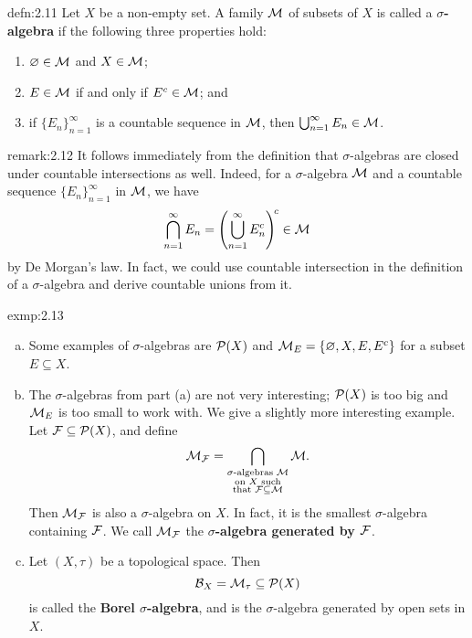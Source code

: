 \begin{defn}{defn:2.11}
    Let $X$ be a non-empty set. A family ${\cal M}$ of subsets of $X$ is 
    called a {\bf $\sigma$-algebra} if the following three properties hold: 
    \begin{enumerate}[(1)]
        \item $\varnothing \in {\cal M}$ and $X \in {\cal M}$; 
        \item $E \in {\cal M}$ if and only if $E^c \in {\cal M}$; and 
        \item if $\{E_n\}_{n=1}^\infty$ is a countable sequence in ${\cal M}$, 
        then $\bigcup_{n=1}^\infty E_n \in {\cal M}$. 
    \end{enumerate}
\end{defn}

\begin{remark}{remark:2.12}
    It follows immediately from the definition that $\sigma$-algebras 
    are closed under countable intersections as well. Indeed, for 
    a $\sigma$-algebra ${\cal M}$ and a countable sequence $\{E_n\}_{n=1}^\infty$ 
    in ${\cal M}$, we have 
    \[ \bigcap_{n=1}^\infty E_n = \left( \bigcup_{n=1}^\infty E_n^c \right)^{\!c} 
    \in {\cal M} \] 
    by De Morgan's law. In fact, we could use countable intersection 
    in the definition of a $\sigma$-algebra and derive countable unions from it.
\end{remark}

\begin{exmp}{exmp:2.13}
    \begin{enumerate}[(a)]

        \item Some examples of $\sigma$-algebras are ${\cal P}(X)$ and 
        ${\cal M}_E = \{\varnothing, X, E, E^c\}$ for a subset $E \subseteq X$.

        \item The $\sigma$-algebras from part (a) are not very interesting; 
        ${\cal P}(X)$ is too big and ${\cal M}_E$ is too small to work with. 
        We give a slightly more interesting example. Let ${\cal F} \subseteq 
        {\cal P}(X)$, and define 
        \[ {\cal M}_{\cal F} = \bigcap_{\substack{
            \text{$\sigma$-algebras ${\cal M}$} \\ 
            \text{on $X$ such} \\ 
            \text{that } {\cal F} \subseteq {\cal M}}} {\cal M}. \] 
        Then ${\cal M}_{\cal F}$ is also a $\sigma$-algebra on $X$. 
        In fact, it is the smallest $\sigma$-algebra containing 
        ${\cal F}$. We call ${\cal M}_{\cal F}$ the {\bf $\sigma$-algebra 
        generated by ${\cal F}$}.

        \item Let $(X, \tau)$ be a topological space. Then 
        \[ {\cal B}_X = {\cal M}_\tau \subseteq {\cal P}(X) \] 
        is called the {\bf Borel $\sigma$-algebra}, and is the $\sigma$-algebra 
        generated by open sets in $X$. 
    \end{enumerate}
\end{exmp}

